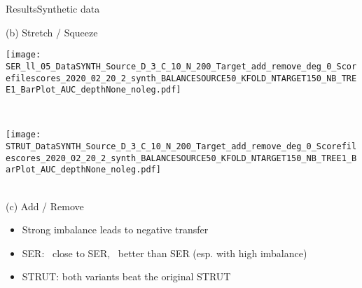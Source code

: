 \begin{frame}{Results}{Synthetic data}
\begin{minipage}[t]{0.33\linewidth}
            \medskip
            {\small(b)\; Stretch / Squeeze}
        \end{minipage}
        \begin{minipage}[t]{0.33\linewidth}\vspace{0pt}
            \centering
            \begin{minipage}[t]{\ratio\linewidth}\vspace{0pt}
            \centerline{\texttt{[image: SER\_ll\_05\_DataSYNTH\_Source\_D\_3\_C\_10\_N\_200\_Target\_add\_remove\_deg\_0\_Scorefilescores\_2020\_02\_20\_2\_synth\_BALANCESOURCE50\_KFOLD\_NTARGET150\_NB\_TREE1\_BarPlot\_AUC\_depthNone\_noleg.pdf]}}
            \end{minipage}\\
            \begin{minipage}[t]{\ratio\linewidth}\vspace{0cm}
            \centerline{\texttt{[image: STRUT\_DataSYNTH\_Source\_D\_3\_C\_10\_N\_200\_Target\_add\_remove\_deg\_0\_Scorefilescores\_2020\_02\_20\_2\_synth\_BALANCESOURCE50\_KFOLD\_NTARGET150\_NB\_TREE1\_BarPlot\_AUC\_depthNone\_noleg.pdf]}}
            \end{minipage}\\
            \medskip
            {\small(c)\; Add / Remove}
        \end{minipage}

\begin{itemize}
    \item Strong imbalance leads to negative transfer
    \item SER: \serll\ close to SER, \serr\ better than SER (esp. with high imbalance)
    \item STRUT: both variants beat the original STRUT
\end{itemize}

    
\end{frame}


